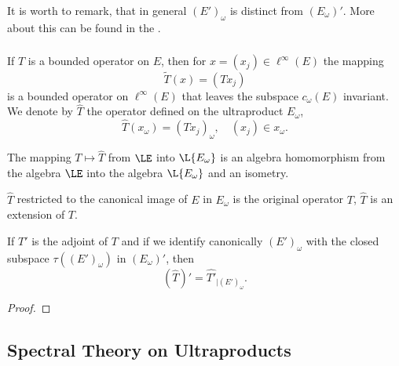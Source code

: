 \documentclass[%
	,english 
	,headings	= small 
	,leqno
	,parskip		= half+
	,DIV			= 14
	,BCOR 			= 10mm	
		]{scrartcl}
\begin{document}
\begin{multicols}{2}
It is worth to remark, that in general $ (E')_{ \omega }  $ is distinct from $ ( E_{ \omega } ){}' $.
More about this can be found in the \textcite[1.7]{heinrich:1980}.

 

\subsubsection{}
If $ T $ is a bounded operator on $ E $, then for $ x = ( x_{ j } ) \in \ell^{ \infty }( E ) $ the mapping 
%
\[
    \widetilde{ T } ( x ) = ( T x_{ j } )
\]
%
is a bounded operator on $ \ell^{ \infty }( E ) $ that leaves the subspace $ c_{ \omega }( E ) $ invariant.
We denote by $ \hat{T} $ the operator defined on the ultraproduct $ E_{ \omega } $, \ie
%
\[
    \hat{T}( x_{ \omega } ) = ( T x_{ j } )_{ \omega }  ,  
    \quad ( x_{ j } ) \in x_{ \omega }  . 
\]
%
\begin{proposition}\label{lem:einbettung-le}
\begin{myenumerate}
\item
The mapping $ T \mapsto \hat{ T } $ from $ \LE $ into $ \L{ E_{ \omega } } $ is an algebra homomorphism from the algebra $ \LE $ into the algebra $ \L{ E_{ \omega } } $ and an isometry.

\item
$ \hat{ T } $ restricted to the canonical image of $ E $ in $ E_{ \omega } $ is the original operator $ T $, \ie $ \hat{T} $ is an extension of $ T $.

\item
If $ T' $ is the adjoint of $ T $ and if we identify canonically $ (E')_{ \omega } $ with the closed subspace $ \tau( (E')_{ \omega } ) $ in $ ( E_{ \omega } ){}' $, then 
%
\[
   	( \hat{ T } ){}' = \hat{ T' }_{ \vert (E')_{ \omega } }  . 
\]
%
\end{myenumerate}

\end{proposition}
%
\begin{proof}

\end{proof}
%
\subsection*{Spectral Theory on Ultraproducts}

\end{multicols}
\end{document}
